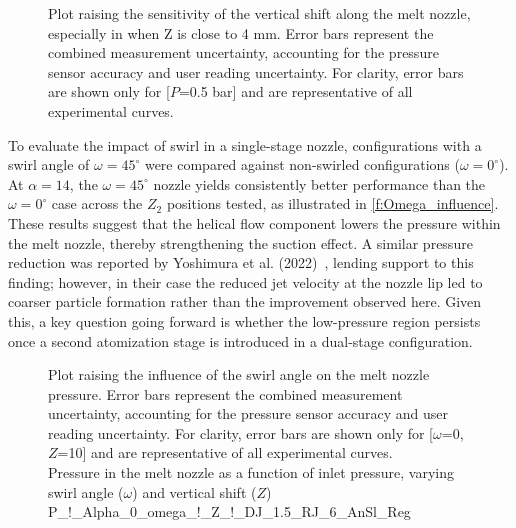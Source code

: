 \documentclass[../../../main.tex]{subfiles}
\begin{document}
\vspace{0mm}
\begin{figure}[H]
    \centering
        
        \caption[Plot raising the sensitivity of the vertical shift along the melt nozzle, especially in when Z is close to 4 mm.]{Plot raising the sensitivity of the vertical shift along the melt nozzle, especially in when Z is close to 4 mm. Error bars represent the combined measurement uncertainty, accounting for the pressure sensor accuracy and user reading uncertainty. For clarity, error bars are shown only for [$P$=0.5 bar] and are representative of all experimental curves.}
        \label{f:Z_influence_investigation}
\end{figure}
\FloatBarrier
\vspace{0mm}

To evaluate the impact of swirl in a single-stage nozzle, configurations with a swirl angle of $\omega=45^\circ$ were compared against non-swirled configurations ($\omega=0^\circ$). At $\alpha=14$, the $\omega=45^\circ$ nozzle yields consistently better performance than the $\omega=0^\circ$ case across the $Z_2$ positions tested, as illustrated in \autoref{f:Omega_influence}. These results suggest that the helical flow component lowers the pressure within the melt nozzle, thereby strengthening the suction effect. A similar pressure reduction was reported by Yoshimura et al. (2022)~\cite{Yoshimura2022ProductionMetal}, lending support to this finding; however, in their case the reduced jet velocity at the nozzle lip led to coarser particle formation rather than the improvement observed here. Given this, a key question going forward is whether the low-pressure region persists once a second atomization stage is introduced in a dual-stage configuration.

\vspace{0mm}
\begin{figure}[H]
    \centering
        
        \caption{Plot raising the influence of the swirl angle on the melt nozzle pressure. Error bars represent the combined measurement uncertainty, accounting for the pressure sensor accuracy and user reading uncertainty. For clarity, error bars are shown only for [$\omega$=0, $Z$=10] and are representative of all experimental curves.
        \\ Pressure in the melt nozzle as a function of inlet pressure, varying swirl angle ($\omega$) and vertical shift ($Z$) P\_!\_Alpha\_0\_omega\_!\_Z\_!\_DJ\_1.5\_RJ\_6\_AnSl\_Reg}
        \label{f:Omega_influence}
\end{figure}
\FloatBarrier
\vspace{0mm}
\end{document}

